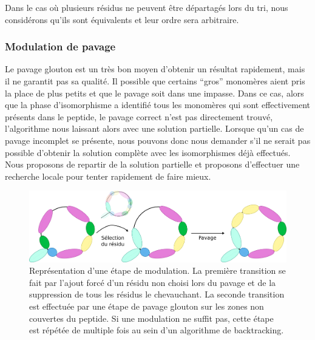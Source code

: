 Dans le cas où plusieurs résidus ne peuvent être départagés lors du tri, nous considérons qu'ils sont équivalents et leur ordre sera arbitraire.


\subsubsection{Modulation de pavage}

Le pavage glouton est un très bon moyen d'obtenir un résultat rapidement, mais il ne garantit pas sa qualité.
Il possible que certains ``gros'' monomères aient pris la place de plus petits et que le pavage soit dans une impasse.
Dans ce cas, alors que la phase d'isomorphisme a identifié tous les monomères qui sont effectivement présents dans le peptide, le pavage correct n'est pas directement trouvé, l'algorithme nous laissant alors avec une solution partielle.
Lorsque qu'un cas de pavage incomplet se présente, nous pouvons donc nous demander s'il ne serait pas possible d'obtenir la solution complète avec les isomorphismes déjà effectués.
Nous proposons de repartir de la solution partielle et proposons d'effectuer une recherche locale pour tenter rapidement de faire mieux.

\begin{figure}[!ht]
  \begin{center}
    \includegraphics[width=450px]{Figures/s2m/pavage/modulation.png}
    \caption{\label{modulation}Représentation d'une étape de modulation.
    La première transition se fait par l'ajout forcé d'un résidu non choisi lors du pavage et de la suppression de tous les résidus le chevauchant.
    La seconde transition est effectuée par une étape de pavage glouton sur les zones non couvertes du peptide.
    Si une modulation ne suffit pas, cette étape est répétée de multiple fois au sein d'un algorithme de backtracking.}
  \end{center}
\end{figure}

